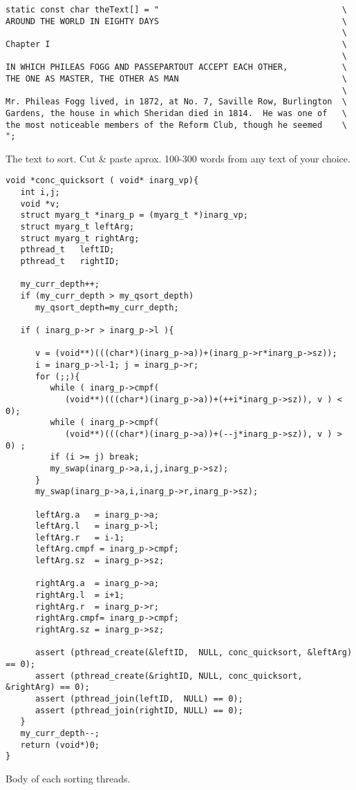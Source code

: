 \begin{table}[!hbp]
\begin{verbatim}
static const char theText[] = "                                     \
AROUND THE WORLD IN EIGHTY DAYS                                     \
                                                                    \
Chapter I                                                           \
                                                                    \
IN WHICH PHILEAS FOGG AND PASSEPARTOUT ACCEPT EACH OTHER,           \
THE ONE AS MASTER, THE OTHER AS MAN                                 \
                                                                    \
Mr. Phileas Fogg lived, in 1872, at No. 7, Saville Row, Burlington  \
Gardens, the house in which Sheridan died in 1814.  He was one of   \
the most noticeable members of the Reform Club, though he seemed    \
";
\end{verbatim}
\caption{The text to sort. Cut \& paste aprox. 100-300 words from any text of your choice.\label{ccsort_text}}
\end{table}

\begin{table}[!hbp]
\begin{verbatim}
void *conc_quicksort ( void* inarg_vp){
   int i,j;
   void *v;
   struct myarg_t *inarg_p = (myarg_t *)inarg_vp;
   struct myarg_t leftArg;
   struct myarg_t rightArg;
   pthread_t   leftID;
   pthread_t   rightID;

   my_curr_depth++;
   if (my_curr_depth > my_qsort_depth)
      my_qsort_depth=my_curr_depth;

   if ( inarg_p->r > inarg_p->l ){

      v = (void**)(((char*)(inarg_p->a))+(inarg_p->r*inarg_p->sz));
      i = inarg_p->l-1; j = inarg_p->r;
      for (;;){
         while ( inarg_p->cmpf(
            (void**)(((char*)(inarg_p->a))+(++i*inarg_p->sz)), v ) < 0);
         while ( inarg_p->cmpf(
            (void**)(((char*)(inarg_p->a))+(--j*inarg_p->sz)), v ) > 0) ;
         if (i >= j) break;
         my_swap(inarg_p->a,i,j,inarg_p->sz);
      }
      my_swap(inarg_p->a,i,inarg_p->r,inarg_p->sz);

      leftArg.a   = inarg_p->a;
      leftArg.l   = inarg_p->l;
      leftArg.r   = i-1;
      leftArg.cmpf = inarg_p->cmpf;
      leftArg.sz  = inarg_p->sz;

      rightArg.a  = inarg_p->a;
      rightArg.l  = i+1;
      rightArg.r  = inarg_p->r;
      rightArg.cmpf= inarg_p->cmpf;
      rightArg.sz = inarg_p->sz;

      assert (pthread_create(&leftID,  NULL, conc_quicksort, &leftArg)  == 0);
      assert (pthread_create(&rightID, NULL, conc_quicksort, &rightArg) == 0);
      assert (pthread_join(leftID,  NULL) == 0);     
      assert (pthread_join(rightID, NULL) == 0);     
   }
   my_curr_depth--;
   return (void*)0;
}
\end{verbatim}
\caption{Body of each sorting threads.\label{ccsort_thread}}
\end{table}

